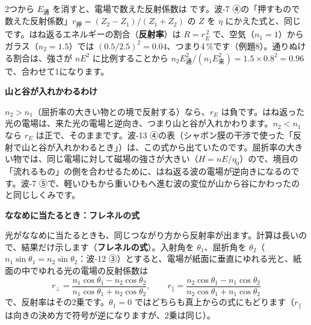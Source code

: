 2つから $E_{\text{通}}$ を消すと、電場で数えた反射係数は
\label{ph:電-15:rE}です。波-7 ④の「押すもので数えた反射係数」$r_{\text{押}}=(Z_2-Z_1)/(Z_1+Z_2)$ の $Z$ を $\eta$ にかえた式と、同じです。はね返るエネルギーの割合（\textbf{反射率}）は $R=r_E^{\,2}$ で、空気（$n_1=1$）からガラス（$n_2=1.5$）では $(0.5/2.5)^2=0.04$、つまり4\,\%です（例題8）。通りぬける割合は、強さが $nE^2$ に比例することから $n_2E_{\text{通}}^2/(n_1E_{\text{来}}^2)=1.5\times0.8^2=0.96$ で、合わせて1になります。

\noindent\textbf{山と谷が入れかわるわけ}\par\nobreak
\label{ph:電-15:irekawari}$n_2>n_1$（屈折率の大きい物との境で反射する）なら、$r_E$ は負です。はね返った光の電場は、来た光の電場と逆向き、つまり山と谷が入れかわります。$n_2<n_1$ なら $r_E$ は正で、そのままです。波-13 ④の表（シャボン膜の干渉で使った「反射で山と谷が入れかわるとき」）は、この式から出ていたのです。屈折率の大きい物では、同じ電場に対して磁場の強さが大きい（$H=nE/\eta_0$）ので、境目の「流れるもの」の側を合わせるために、はね返る波の電場が逆向きになるのです。波-7 ⑤で、軽いひもから重いひもへ進む波の変位が山から谷にかわったのと同じしくみです。

\noindent\textbf{ななめに当たるとき：フレネルの式}\par\nobreak
光がななめに当たるときも、同じつながり方から反射率が出ます。計算は長いので、結果だけ示します（\textbf{フレネルの式}）。入射角を $\theta_1$、屈折角を $\theta_2$（$n_1\sin\theta_1=n_2\sin\theta_2$：波-12 ③）とすると、電場が紙面に垂直にゆれる光と、紙面の中でゆれる光の電場の反射係数は
\[ r_{\perp}=\frac{n_1\cos\theta_1-n_2\cos\theta_2}{n_1\cos\theta_1+n_2\cos\theta_2},\qquad r_{\parallel}=\frac{n_2\cos\theta_1-n_1\cos\theta_2}{n_2\cos\theta_1+n_1\cos\theta_2} \]
で、反射率はその2乗です。$\theta_1=0$ ではどちらも真上からの式にもどります（$r_\parallel$ は向きの決め方で符号が逆になりますが、2乗は同じ）。

